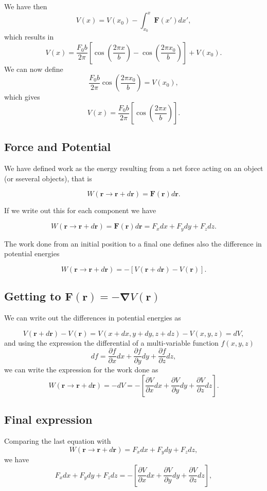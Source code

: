 \documentclass[%
oneside,                 %
final,                   %
10pt]{article}
\begin{document}
We have then
\[
V(x)=V(x_0)-\int_{x_0}^x \bm{F}(x')dx',
\]
which results in
\[
V(x)=\frac{F_0b}{2\pi}\left[\cos{(\frac{2\pi x}{b})}-\cos{(\frac{2\pi x_0}{b})}\right]+V(x_0).
\]
We can now define
\[
\frac{F_0b}{2\pi}\cos{(\frac{2\pi x_0}{b})}=V(x_0),
\]
which gives 
\[
V(x)=\frac{F_0b}{2\pi}\left[\cos{(\frac{2\pi x}{b})}\right].
\]

\subsection{Force and Potential}

We have defined work as the energy resulting from a net force acting
on an object (or sseveral objects), that is

\[
W(\bm{r}\rightarrow \bm{r}+d\bm{r})= \bm{F}(\bm{r})d\bm{r}.
\]

If we write out this for each component we have

\[
W(\bm{r}\rightarrow \bm{r}+d\bm{r})=\bm{F}(\bm{r})d\bm{r}=F_xdx+F_ydy+F_zdz.
\]

The work done from an initial position to a final one defines also the difference in potential energies

\[
W(\bm{r}\rightarrow \bm{r}+d\bm{r})=-\left[V(\bm{r}+d\bm{r})-V(\bm{r})\right].
\]

\subsection{Getting to $\bm{F}(\bm{r})=-\bm{\nabla} V(\bm{r})$}

We can write out the differences in potential energies as

\[
V(\bm{r}+d\bm{r})-V(\bm{r})=V(x+dx,y+dy,z+dz)-V(x,y,z)=dV,
\]
and using the expression the differential of a multi-variable function $f(x,y,z)$ 
\[
df=\frac{\partial f}{\partial x}dx+\frac{\partial f}{\partial y}dy+\frac{\partial f}{\partial z}dz,
\]
we can write the expression for the work done as
\[
W(\bm{r}\rightarrow \bm{r}+d\bm{r})=-dV=-\left[\frac{\partial V}{\partial x}dx+\frac{\partial V}{\partial y}dy+\frac{\partial V}{\partial z}dz \right].
\]

\subsection{Final expression}

Comparing the last equation with 
\[
W(\bm{r}\rightarrow \bm{r}+d\bm{r})=F_xdx+F_ydy+F_zdz,
\]
we have
\[
F_xdx+F_ydy+F_zdz=-\left[\frac{\partial V}{\partial x}dx+\frac{\partial V}{\partial y}dy+\frac{\partial V}{\partial z}dz \right],
\]
\end{document}
